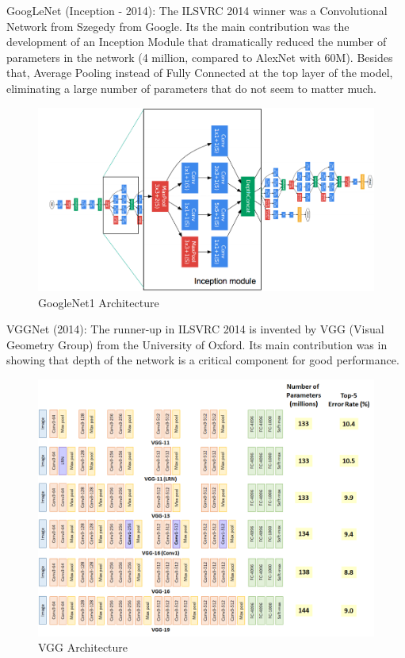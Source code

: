 GoogLeNet (Inception - 2014): The ILSVRC 2014 winner was a Convolutional Network from Szegedy from Google. Its the main contribution was the development of an Inception Module that dramatically reduced the number of parameters in the network (4 million, compared to AlexNet with 60M). Besides that, Average Pooling instead of Fully Connected at the top layer of the model, eliminating a large number of parameters that do not seem to matter much.
\begin{center}
  \begin{figure}[H]
  \centering
  \includegraphics[width=1\columnwidth]{images/chap2/GoogleNet1.png}
  \caption{GoogleNet1 Architecture}
  \label{chap2:WSP}
  \end{figure}
\end{center}
VGGNet (2014): The runner-up in ILSVRC 2014 is invented by VGG (Visual Geometry Group) from the University of Oxford. Its main contribution was in showing that depth of the network is a critical component for good performance. 
\begin{center}
  \begin{figure}[H]
  \centering
  \includegraphics[width=1\columnwidth]{images/chap2/VGG_arch.png}
  \caption{VGG Architecture}
  \label{chap2:WSP}
  \end{figure}
\end{center}
